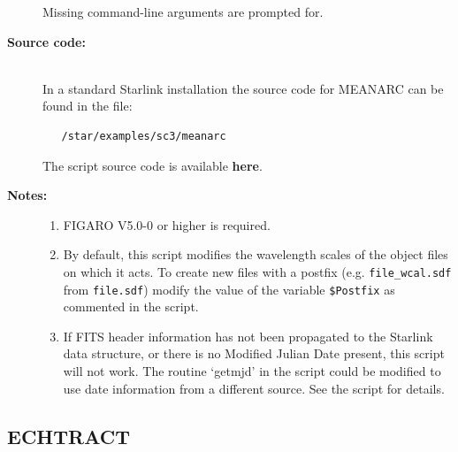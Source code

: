 \documentclass[twoside,11pt]{article}
\newcommand{\stardocinitials}  {SC}
\newcommand{\stardocnumber}    {3.2-0} %
\newcommand{\stardocname}{\stardocinitials /\stardocnumber}
\newenvironment{latexonly}{}{}
\newcommand{\htmlref}[2]{#1}
\newcommand{\xlabel}[1]{}
\begin{document}
\begin{description}
\begin{enumerate}
\end{enumerate}

     Missing command-line arguments are prompted for.

\item [{\bf Source code:}] \mbox{} \\
\begin{latexonly}
In a standard Starlink installation the source code for MEANARC can be found
in the file:
\begin{verbatim}
   /star/examples/sc3/meanarc
\end{verbatim}
\end{latexonly}
\begin{htmlonly}
      The script source code is available
      \htmlref{{\bf here}}{se_meanarc_source}.
\end{htmlonly}

\newpage
\item [{\bf Notes:}] \mbox{}
\begin{enumerate}

\item FIGARO V5.0-0 or higher is required.

\item By default, this script modifies the wavelength scales of the
      object files on which it acts.  To create new files with a
      postfix (e.g. \verb+file_wcal.sdf+ from \verb+file.sdf+) modify the
      value of the variable \verb+$Postfix+ as commented in the
      script.  %

\item If FITS header information has not been propagated to the
      Starlink data structure, or there is no Modified Julian Date
      present, this script will not work.  The routine `getmjd' in
      the script could be modified to use date information from a
      different source.  See the script for details.

\end{enumerate}

\end{description}

\newpage
\subsection{\label{se_echtract}\xlabel{ECHTRACT}ECHTRACT}
\markboth{ECHTRACT}{\stardocname}
\end{document}
